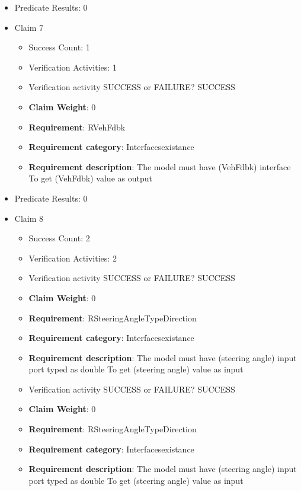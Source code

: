\documentclass{article}
\begin{document}
\begin{itemize}
\begin{itemize}
				\end{itemize}
				
									    
				\item Predicate Results: 0

  				  \item Claim 7
				\begin{itemize}
			    	\item Success Count: 1 
			    	\item Verification Activities: 1
					\item Verification activity SUCCESS or FAILURE? SUCCESS
					\item \textbf{Claim Weight}: 0
						\item \textbf{Requirement}: RVehFdbk 
						\item \textbf{Requirement category}: Interfacesexistance 
						\item \textbf{Requirement description}: The model must have (VehFdbk) interface To get (VehFdbk) value as output
					
				\end{itemize}
				
									    
				\item Predicate Results: 0

  				  \item Claim 8
				\begin{itemize}
			    	\item Success Count: 2 
			    	\item Verification Activities: 2
					\item Verification activity SUCCESS or FAILURE? SUCCESS
					\item \textbf{Claim Weight}: 0
						\item \textbf{Requirement}: RSteeringAngleTypeDirection 
						\item \textbf{Requirement category}: Interfacesexistance 
						\item \textbf{Requirement description}: The model must have (steering angle) input port typed as double To get (steering angle) value as input
					
					\item Verification activity SUCCESS or FAILURE? SUCCESS
					\item \textbf{Claim Weight}: 0
						\item \textbf{Requirement}: RSteeringAngleTypeDirection 
						\item \textbf{Requirement category}: Interfacesexistance 
						\item \textbf{Requirement description}: The model must have (steering angle) input port typed as double To get (steering angle) value as input
					

\end{itemize}
\end{itemize}
\end{document}
